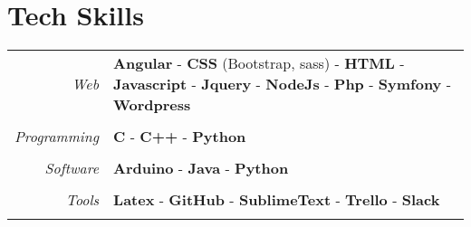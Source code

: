 \documentclass[a4paper,10pt]{article}
\newcommand{\tech}[1]{
  \textbf{#1}
}
\begin{document}

\section{Tech Skills}

\begin{tabular}{r|p{14.3cm}}

  \emph{Web}                 & \tech{Angular} - \tech{CSS} (Bootstrap, sass) - \tech{HTML} - \tech{Javascript} - \tech{Jquery} - \tech{NodeJs} - \tech{Php} - \tech{Symfony} - \tech{Wordpress}\\
  \multicolumn{2}{c}{} \\

  \emph{Programming}         & \tech{C} - \tech{C++} - \tech{Python}\\
  \multicolumn{2}{c}{} \\

  \emph{Software}            & \tech{Arduino} - \tech{Java} - \tech{Python}\\
  \multicolumn{2}{c}{} \\

  \emph{Tools}            & \tech{Latex} - \tech{GitHub} - \tech{SublimeText} - \tech{Trello} - \tech{Slack}\\
  \multicolumn{2}{c}{} \\

\end{tabular}
\end{document}
